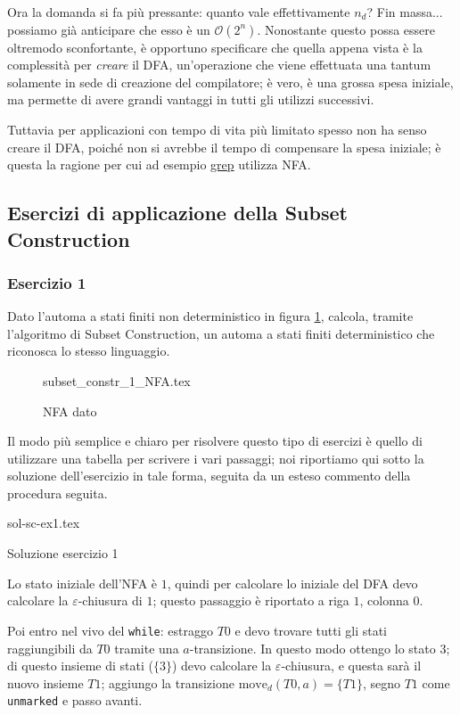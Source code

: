 \documentclass[class=book, crop=false, oneside, 12pt]{standalone}
\begin{document}
Ora la domanda si fa più pressante: quanto vale effettivamente \(n_d\)?
Fin massa... possiamo già anticipare che esso è un \(\mathcal{O}(2^n)\). Nonostante questo possa essere oltremodo sconfortante, è opportuno specificare che quella appena vista è la complessità per \emph{creare} il DFA, un'operazione che viene effettuata una tantum solamente in sede di creazione del compilatore; è vero, è una grossa spesa iniziale, ma permette di avere grandi vantaggi in tutti gli utilizzi successivi.

Tuttavia per applicazioni con tempo di vita più limitato spesso non ha senso creare il DFA, poiché non si avrebbe il tempo di compensare la spesa iniziale; è questa la ragione per cui ad esempio \href{https://it.wikipedia.org/wiki/Grep}{grep} utilizza NFA.


\subsection{Esercizi di applicazione della Subset Construction}
\subsubsection*{Esercizio 1}
Dato l'automa a stati finiti non deterministico in figura \ref{es_sc_1}, calcola, tramite l'algoritmo di Subset Construction, un automa a stati finiti deterministico che riconosca lo stesso linguaggio.
\begin{figure}[H]
    \centering
    {subset_constr_1_NFA.tex}
    \caption{NFA dato}
    \label{es_sc_1}
\end{figure}

Il modo più semplice e chiaro per risolvere questo tipo di esercizi è quello di utilizzare una tabella per scrivere i vari passaggi; noi riportiamo qui sotto la soluzione dell'esercizio in tale forma, seguita da un esteso commento della procedura seguita.
\begin{table}[H]
	\centering
	{sol-sc-ex1.tex}
    \caption{Soluzione esercizio 1}
    \label{sol-sc-ex1}
\end{table} 
Lo stato iniziale dell'NFA è \(1\), quindi per calcolare lo iniziale del DFA devo calcolare la \(\varepsilon\)-chiusura di \(1\); questo passaggio è riportato a riga \(1\), colonna \(0\).

Poi entro nel vivo del \texttt{while}: estraggo \(T0\) e devo trovare tutti gli stati raggiungibili da \(T0\) tramite una \(a\)-transizione. In questo modo ottengo lo stato \(3\); di questo insieme di stati (\(\{3\}\)) devo calcolare la \(\varepsilon\)-chiusura, e questa sarà il nuovo insieme \(T1\); aggiungo la transizione \(\textrm{move}_d(T0, a)=\{T1\}\), segno \(T1\) come \texttt{unmarked} e passo avanti.
\end{document}
